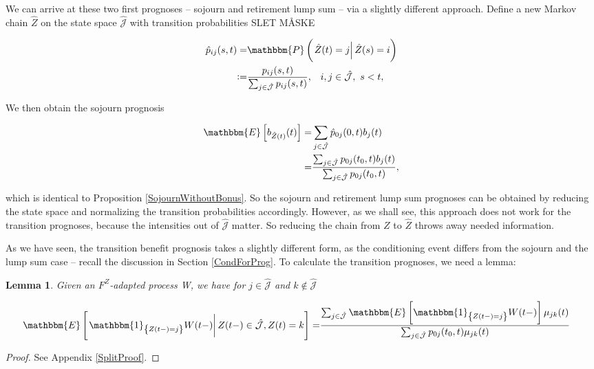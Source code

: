 \documentclass{book}
\newcommand{\1}[1]{\mathbbm{1}_{\left\lbrace #1 \right\rbrace}}
\newcommand{\expec}[1][def]{\mathbbm{E} \left[ #1 \right]}
\newcommand{\econd}[2][def]{\mathbbm{E} \left[ \left. #1 \right| #2 \right]}
\newcommand{\pcond}[2][def]{\mathbbm{P} \left( \left. #1 \right| #2 \right)}
\theoremstyle{break}
\newtheorem{lemma}[definition]{Lemma}
\theoremstyle{remark}
\newenvironment{remark}
  {\pushQED{\qed}\renewcommand{\qedsymbol}{\scalebox{1.4}{$\circ$}}\remarkx}
  {\popQED\endremarkx}
\numberwithin{equation}{section}
\begin{document}
\begin{remark}[Reducing the state space] \label{ReducedStateSpace}
We can arrive at these two first prognoses -- sojourn and retirement lump sum -- via a slightly different approach. Define a new Markov chain $\hat{Z}$ on the state space $\hat{\mathcal{J}}$ with transition probabilities SLET MÅSKE

\begin{align*}
    \hat{p}_{ij}(s,t) =& \pcond[\hat{Z}(t) = j]{\hat{Z}(s) = i} \\
    :=& \frac{p_{ij}(s,t)}{\sum_{j \in \hat{\mathcal{J}}} p_{ij}(s,t)}, \, \, \, \, \, i,j \in \hat{\mathcal{J}}, \, \, s < t,
\end{align*}

We then obtain the sojourn prognosis

\begin{align*}
    \expec[b_{\hat{Z}(t)}(t)] =& \sum_{j \in \hat{\mathcal{J}}} \hat{p}_{0j}(0,t) b_j(t) \\
    =& \frac{\sum_{j \in \hat{\mathcal{J}}} p_{0j}(t_0,t) b_j(t)}{\sum_{j \in \hat{\mathcal{J}}} p_{0j}(t_0,t)},
\end{align*}

which is identical to Proposition \ref{SojournWithoutBonus}. So the sojourn and retirement lump sum prognoses can be obtained by reducing the state space and normalizing the transition probabilities accordingly. However, as we shall see, this approach does not work for the transition prognoses, because the intensities out of $\hat{\mathcal{J}}$ matter. So reducing the chain from $Z$ to $\hat{Z}$ throws away needed information.
\end{remark}

As we have seen, the transition benefit prognosis takes a slightly different form, as the conditioning event differs from the sojourn and the lump sum case -- recall the discussion in Section \ref{CondForProg}. To calculate the transition prognoses, we need a lemma:

\begin{lemma} \label{Split}
	Given an $F^Z$-adapted process W, we have for $j \in \hat{\mathcal{J}}$ and $k \notin \hat{\mathcal{J}}$
	
	\begin{align*}
		\econd[\1{Z(t-)=j} W(t-)]{Z(t-) \in \hat{\mathcal{J}}, Z(t) = k} =& \frac{\sum_{j \in \hat{\mathcal{J}}} \expec[\1{Z(t-)=j} W(t-)] \mu_{jk}(t)}{\sum_{j \in \hat{\mathcal{J}}} p_{0j}(t_0,t) \mu_{jk}(t)}
	\end{align*}
\end{lemma}
\begin{proof}
	See Appendix \ref{SplitProof}.
\end{proof}
\end{document}
